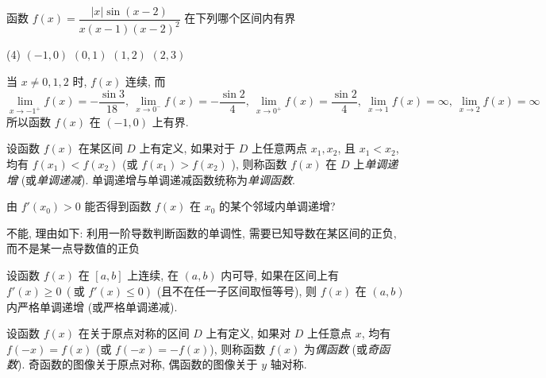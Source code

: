 \begin{example}[2004 数三]
    函数 $f(x)=\dfrac{|x|\sin(x-2)}{x(x-1)(x-2)^2}$ 在下列哪个区间内有界
    \begin{tasks}(4)
        \task $(-1,0)$
        \task $(0,1)$
        \task $(1,2)$
        \task $(2,3)$
    \end{tasks}
\end{example}
\begin{solution}
    当 $x\neq0,1,2$ 时, $f(x)$ 连续, 而
    $$\lim_{x\to-1^+}f(x)=-\dfrac{\sin 3}{18},~\lim_{x\to0^-}f(x)=-\dfrac{\sin 2}{4},~\lim_{x\to0^+}f(x)=\dfrac{\sin 2}{4},~\lim_{x\to1}f(x)=\infty,~\lim_{x\to2}f(x)=\infty$$
    所以函数 $f(x)$ 在 $(-1,0)$ 上有界.
\end{solution}

\begin{definition}[单调性]
    设函数 $ f(x) $ 在某区间 $ D $ 上有定义, 如果对于 $ D $ 上任意两点 $ x_{1}, x_{2} $, 且 $ x_{1}<x_{2} $, 均有 $ f\left(x_{1}\right)<f\left(x_{2}\right) $ (或 $ f\left(x_{1}\right)>f\left(x_{2}\right) $ ), 则称函数 $ f(x) $ 在 $ D $ 上\textit{单调递增} (或\textit{单调递减}). 单调递增与单调递减函数统称为\textit{单调函数}.
\end{definition}

\begin{example}
    由 $f'(x_0)>0$ 能否得到函数 $f(x)$ 在 $x_0$ 的某个邻域内单调递增?
\end{example}
\begin{solution}
    不能, 理由如下:
    利用一阶导数判断函数的单调性, 需要已知导数在某区间的正负, 而不是某一点导数值的正负
\end{solution}

\begin{theorem}[函数的单调性判定]
    设函数 $f(x)$ 在 $[a,b]$ 上连续, 在 $(a,b)$ 内可导, 如果在区间上有 $f'(x)\geqslant 0~(\text{或 }f'(x)\leqslant 0)$ (且不在任一子区间取恒等号), 则 $f(x)$ 在 $(a,b)$ 内严格单调递增 (或严格单调递减).
\end{theorem}

\begin{definition}[奇偶性]
    设函数 $ f(x) $ 在关于原点对称的区间 $ D $ 上有定义, 如果对 $ D $ 上任意点 $ x $, 均有 $ f(-x)=f(x) $ (或 $ f(-x)=-f(x)$), 则称函数 $ f(x) $ 为\textit{偶函数} (或\textit{奇函数}). 奇函数的图像关于原点对称, 偶函数的图像关于 $ y $ 轴对称.
\end{definition}

